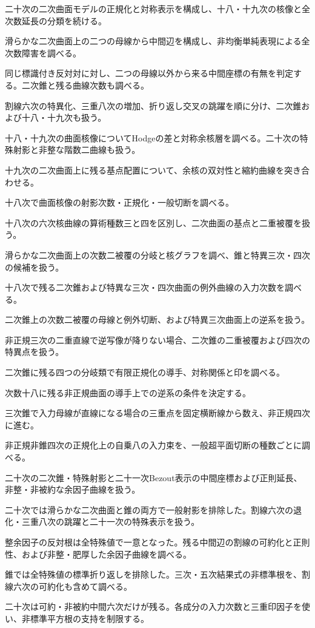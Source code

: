 \documentclass[11pt,a4paper]{ltjsarticle}
\begin{document}
二十次の二次曲面モデルの正規化と対称表示を構成し、十八・十九次の核像と全次数延長の分類を続ける。

滑らかな二次曲面上の二つの母線から中間辺を構成し、非均衡単純表現による全次数障害を調べる。

同じ標識付き反対対に対し、二つの母線以外から来る中間座標の有無を判定する。二次錐と残る曲線次数も調べる。

割線六次の特異化、三重八次の増加、折り返し交叉の跳躍を順に分け、二次錐および十八・十九次も扱う。

十八・十九次の曲面核像についてHodgeの差と対称余核層を調べる。二十次の特殊射影と非整な階数二曲線も扱う。

十九次の二次曲面上に残る基点配置について、余核の双対性と縮約曲線を突き合わせる。

十八次で曲面核像の射影次数・正規化・一般切断を調べる。

十八次の六次核曲線の算術種数三と四を区別し、二次曲面の基点と二重被覆を扱う。

滑らかな二次曲面上の次数二被覆の分岐と核グラフを調べ、錐と特異三次・四次の候補を扱う。

十八次で残る二次錐および特異な三次・四次曲面の例外曲線の入力次数を調べる。

二次錐上の次数二被覆の母線と例外切断、および特異三次曲面上の逆系を扱う。

非正規三次の二重直線で逆写像が降りない場合、二次錐の二重被覆および四次の特異点を扱う。

二次錐に残る四つの分岐類で有限正規化の導手、対称関係と印を調べる。

次数十八に残る非正規曲面の導手上での逆系の条件を決定する。

三次錐で入力母線が直線になる場合の三重点を固定横断線から数え、非正規四次に進む。

非正規非錐四次の正規化上の自乗八の入力束を、一般超平面切断の種数ごとに調べる。

二十次の二次錐・特殊射影と二十一次Bezout表示の中間座標および正則延長、非整・非被約な余因子曲線を扱う。

二十次では滑らかな二次曲面と錐の両方で一般射影を排除した。割線六次の退化・三重八次の跳躍と二十一次の特殊表示を扱う。

整余因子の反対根は全特殊値で一意となった。残る中間辺の割線の可約化と正則性、および非整・肥厚した余因子曲線を調べる。

錐では全特殊値の標準折り返しを排除した。三次・五次結果式の非標準根を、割線六次の可約化も含めて調べる。

二十次は可約・非被約中間六次だけが残る。各成分の入力次数と三重印因子を使い、非標準平方根の支持を制限する。
\end{document}
